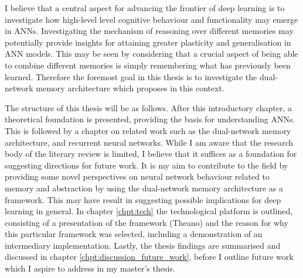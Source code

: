 I believe that a central aspect for advancing the frontier of deep learning is to investigate how high-level level cognitive behaviour and functionality may emerge in ANNs. Investigating the mechanism of reasoning over different memories may potentially provide insights for attaining greater plasticity and generalisation in ANN models. This may be seen by considering that a crucial aspect of being able to combine different memories is simply remembering what has previously been learned. Therefore the foremost goal in this thesis is to investigate the dual-network memory architecture which \cite{Hattori2014} proposes in this context.

The structure of this thesis will be as follows. After this introductory chapter, a theoretical foundation is presented, providing the basis for understanding ANNs. This is followed by a chapter on related work such as the dual-network memory architecture, and recurrent neural networks. While I am aware that the research body of the literary review is limited, I believe that it suffices as a foundation for suggesting directions for future work. It is my aim to contribute to the field by providing some novel perspectives on neural network behaviour related to memory and abstraction by using the dual-network memory architecture as a framework. This may have result in suggesting possible implications for deep learning in general. In chapter \ref{chpt:tech} the technological platform is outlined, consisting of a presentation of the framework (Theano) and the reason for why this particular framework was selected, including a demonstration of an intermediary implementation. Lastly, the thesis findings are summarised and discussed in chapter \ref{chpt:discussion_future_work}, before I outline future work which I aspire to address in my master's thesis.


\cleardoublepage